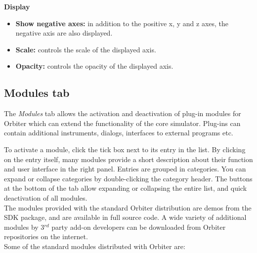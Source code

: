 \documentclass[Orbiter User Manual.tex]{subfiles}
\begin{document}
\noindent
\textbf{Display}
\begin{itemize}
\item \textbf{Show negative axes:} in addition to the positive x, y and z axes, the negative axis are also displayed.
\item \textbf{Scale:} controls the scale of the displayed axis.
\item \textbf{Opacity:} controls the opacity of the displayed axis.
\end{itemize}


\subsection{Modules tab}
\label{ssec:launchpad_modules}
The \textit{Modules} tab allows the activation and deactivation of plug-in modules for Orbiter which can extend the functionality of the core simulator. Plug-ins can contain additional instruments, dialogs, interfaces to external programs etc.

\begin{figure}[H]
	\centering
\end{figure}


\noindent
To activate a module, click the tick box next to its entry in the list. By clicking on the entry itself, many modules provide a short description about their function and user interface in the right panel. Entries are grouped in categories. You can expand or collapse categories by double-clicking the category header. The buttons at the bottom of the tab allow expanding or collapsing the entire list, and quick deactivation of all modules.\\
The modules provided with the standard Orbiter distribution are demos from the SDK package, and are available in full source code. A wide variety of additional modules by 3$^{rd}$ party add-on developers can be downloaded from Orbiter repositories on the internet.\\
Some of the standard modules distributed with Orbiter are:
\end{document}
